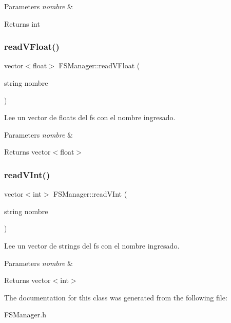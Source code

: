 \begin{DoxyParams}{Parameters}
{\em nombre} & \\
\hline
\end{DoxyParams}
\begin{DoxyReturn}{Returns}
int 
\end{DoxyReturn}
\mbox{\label{classFSManager_a1b052468230cc452488cadadc7a940d5}} 
\subsubsection{\texorpdfstring{read\+V\+Float()}{readVFloat()}}
{\footnotesize\ttfamily vector$<$float$>$ F\+S\+Manager\+::read\+V\+Float (\begin{DoxyParamCaption}\item[{string}]{nombre }\end{DoxyParamCaption})\hspace{0.3cm}{\ttfamily [inline]}}



Lee un vector de floats del fs con el nombre ingresado. 


\begin{DoxyParams}{Parameters}
{\em nombre} & \\
\hline
\end{DoxyParams}
\begin{DoxyReturn}{Returns}
vector$<$float$>$ 
\end{DoxyReturn}
\mbox{\label{classFSManager_a517c15d5e51eb4f07e6ada3aa38e1d0b}} 
\subsubsection{\texorpdfstring{read\+V\+Int()}{readVInt()}}
{\footnotesize\ttfamily vector$<$int$>$ F\+S\+Manager\+::read\+V\+Int (\begin{DoxyParamCaption}\item[{string}]{nombre }\end{DoxyParamCaption})\hspace{0.3cm}{\ttfamily [inline]}}



Lee un vector de strings del fs con el nombre ingresado. 


\begin{DoxyParams}{Parameters}
{\em nombre} & \\
\hline
\end{DoxyParams}
\begin{DoxyReturn}{Returns}
vector$<$int$>$ 
\end{DoxyReturn}


The documentation for this class was generated from the following file\+:\begin{DoxyCompactItemize}
\item 
F\+S\+Manager.\+h\end{DoxyCompactItemize}

